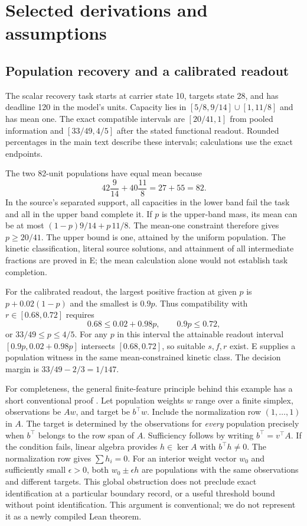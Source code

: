 \section{Selected derivations and assumptions}\label{app:derivations}
\subsection{Population recovery and a calibrated readout}\label{app:enzyme}
The scalar recovery task starts at carrier state 10, targets state 28, and has deadline 120 in the model's units. Capacity lies in $[5/8,9/14]\cup[1,11/8]$ and has mean one. The exact compatible intervals are $[20/41,1]$ from pooled information and $[33/49,4/5]$ after the stated functional readout. Rounded percentages in the main text describe these intervals; calculations use the exact endpoints.

The two 82-unit populations have equal mean because
\[
42\frac9{14}+40\frac{11}{8}=27+55=82.
\]
In the source's separated support, all capacities in the lower band fail the task and all in the upper band complete it. If $p$ is the upper-band mass, its mean can be at most $(1-p)9/14+p\,11/8$. The mean-one constraint therefore gives $p\ge20/41$. The upper bound is one, attained by the uniform population. The kinetic classification, literal source solutions, and attainment of all intermediate fractions are proved in E; the mean calculation alone would not establish task completion.

For the calibrated readout, the largest positive fraction at given $p$ is $p+0.02(1-p)$ and the smallest is $0.9p$. Thus compatibility with $r\in[0.68,0.72]$ requires
\[
0.68\le0.02+0.98p,\qquad0.9p\le0.72,
\]
or $33/49\le p\le4/5$. For any $p$ in this interval the attainable readout interval $[0.9p,0.02+0.98p]$ intersects $[0.68,0.72]$, so suitable $s,f,r$ exist. E supplies a population witness in the same mean-constrained kinetic class. The decision margin is $33/49-2/3=1/147$.

For completeness, the general finite-feature principle behind this example has a short conventional proof \citep{E}. Let population weights $w$ range over a finite simplex, observations be $Aw$, and target be $b^\top w$. Include the normalization row $(1,\ldots,1)$ in $A$. The target is determined by the observations for \emph{every} population precisely when $b^\top$ belongs to the row span of $A$. Sufficiency follows by writing $b^\top=v^\top A$. If the condition fails, linear algebra provides $h\in\ker A$ with $b^\top h\ne0$. The normalization row gives $\sum h_i=0$. For an interior weight vector $w_0$ and sufficiently small $\epsilon>0$, both $w_0\pm\epsilon h$ are populations with the same observations and different targets. This global obstruction does not preclude exact identification at a particular boundary record, or a useful threshold bound without point identification. This argument is conventional; we do not represent it as a newly compiled Lean theorem.

